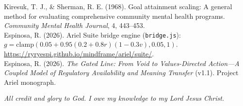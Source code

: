 \documentclass[11pt, a4paper]{article}
\begin{document}
\noindent [13] Kiresuk, T. J., \& Sherman, R. E. (1968). Goal attainment scaling: A general method for evaluating comprehensive community mental health programs. \textit{Community Mental Health Journal}, 4, 443--453.\\
\noindent [14] Espinosa, R. (2026). Ariel Suite bridge engine (\texttt{bridge.js}): $g=\mathrm{clamp}(0.05+0.95(0.2+0.8r)(1-0.3v),0.05,1)$. \url{https://ryryespi.github.io/mindframe/ariel/suite/}.\\
\noindent [15] Espinosa, R. (2026). \textit{The Gated Line: From Void to Values-Directed Action---A Coupled Model of Regulatory Availability and Meaning Transfer} (v1.1). Project Ariel monograph.

\vspace{1.2em}
\noindent\textit{All credit and glory to God. I owe my knowledge to my Lord Jesus Christ.}
\end{document}
